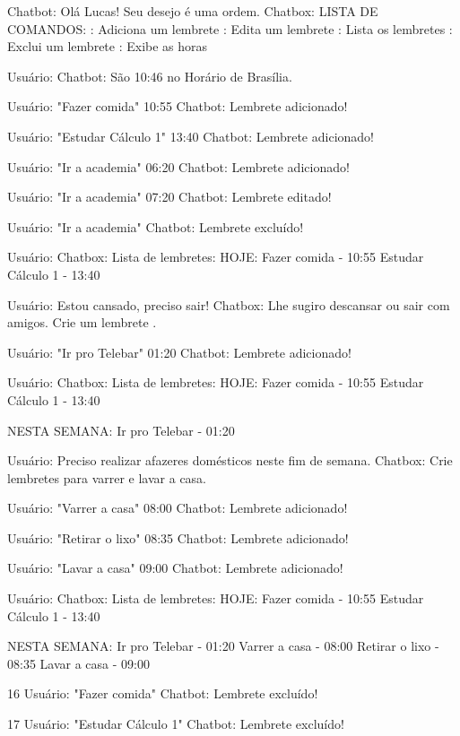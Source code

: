 Chatbot: Olá Lucas! Seu desejo é uma ordem.
Chatbox: LISTA DE COMANDOS:
	\addlembrete: Adiciona um lembrete
	\editlembrete: Edita um lembrete
	\listalembrate: Lista os lembretes
	\excluilembrate: Exclui um lembrete
	\horas: Exibe as horas

Usuário: \horas
Chatbot: São 10:46 no Horário de Brasília.

Usuário: \addlembrete "Fazer comida" 10:55
Chatbot: Lembrete adicionado!

Usuário: \addlembrete "Estudar Cálculo 1" 13:40
Chatbot: Lembrete adicionado!

Usuário: \addlembrete "Ir a academia" 06:20
Chatbot: Lembrete adicionado!

Usuário: \editlembrete "Ir a academia" 07:20
Chatbot: Lembrete editado!

Usuário: \excluilembrete "Ir a academia"
Chatbot: Lembrete excluído!

Usuário: \listalembrete
Chatbox: Lista de lembretes:
	HOJE:
	Fazer comida - 10:55
	Estudar Cálculo 1 - 13:40

Usuário: Estou cansado, preciso sair!
Chatbox: Lhe sugiro descansar ou sair com amigos. Crie um lembrete \addlembrate.

Usuário: \addlembrete "Ir pro Telebar" 01:20
Chatbot: Lembrete adicionado!

Usuário: \listalembrete
Chatbox: Lista de lembretes:
	HOJE:
	Fazer comida - 10:55
	Estudar Cálculo 1 - 13:40

	NESTA SEMANA:
	Ir pro Telebar - 01:20

Usuário: Preciso realizar afazeres domésticos neste fim de semana.
Chatbox: Crie lembretes para varrer e lavar a casa. \addlembrete

Usuário: \addlembrete "Varrer a casa" 08:00
Chatbot: Lembrete adicionado!

Usuário: \addlembrete "Retirar o lixo" 08:35
Chatbot: Lembrete adicionado!

Usuário: \addlembrete "Lavar a casa" 09:00
Chatbot: Lembrete adicionado!

Usuário: \listalembrete
Chatbox: Lista de lembretes:
	HOJE:
	Fazer comida - 10:55
	Estudar Cálculo 1 - 13:40

	NESTA SEMANA:
	Ir pro Telebar - 01:20
	Varrer a casa - 08:00
	Retirar o lixo - 08:35
	Lavar a casa - 09:00

16
Usuário: \excluilembrete "Fazer comida"
Chatbot: Lembrete excluído!

17
Usuário: \excluilembrete "Estudar Cálculo 1"
Chatbot: Lembrete excluído!

